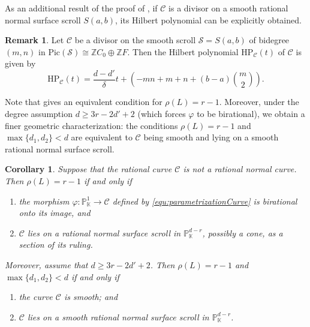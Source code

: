 \documentclass[a4paper, 11pt]{amsart}
\numberwithin{theorem}{section}
\newtheorem{corollary}[theorem]{Corollary}
\theoremstyle{definition}
\newtheorem{remark}[theorem]{Remark}
\numberwithin{equation}{section}
\begin{document}
As an additional result of the proof of , if $\mathcal{C}$ is a divisor on a smooth rational normal surface scroll $S(a,b)$, its Hilbert polynomial can be explicitly obtained.
\begin{remark}\label{rem:hilbertPolynomial}
Let $\mathcal{C}$ be a divisor on the smooth scroll $\mathcal{S} = S(a,b)$ of bidegree $(m,n)$ in $\mathrm{Pic}(\mathcal{S}) \cong \mathbb{Z}C_0 \oplus \mathbb{Z}F$. 
Then the Hilbert polynomial $\mathrm{HP}_{\mathcal{C}}(t)$ of $\mathcal{C}$ is given by
\[
\mathrm{HP}_{\mathcal{C}}(t) = \frac{d-d'}{\delta} t + \left( -mn + m + n + (b-a)\binom{m}{2} \right).
\]
\end{remark}
Note that  gives an equivalent condition for $\rho(L)=r-1$.
Moreover, under the degree assumption $d\geq 3r-2d'+2$ (which forces $\varphi$ to be birational), we obtain a finer geometric characterization: the conditions $\rho(L)=r-1$ and $\max\{d_1,d_2\}<d$ are equivalent to $\mathcal C$ being smooth and lying on a smooth rational normal surface scroll.
\begin{corollary}\label{cor:surface-r}
Suppose that the rational curve $\mathcal{C}$ is not a rational normal curve.
Then $\rho(L)=r-1$ if and only if
\begin{enumerate}
    \item[\textnormal{(i)}] the morphism $\varphi:\mathbb{P}_{\mathbb{K}}^1\rightarrow\mathcal{C}$ defined by \eqref{equ:parametrizationCurve} is birational onto its image, and
    \item[\textnormal{(ii)}] $\mathcal{C}$ lies on a rational normal surface scroll in $\mathbb{P}_{\mathbb{K}}^{d-r}$, possibly a cone, as a section of its ruling.
\end{enumerate}
Moreover, assume that $d\geq 3r-2d'+2$.
Then $\rho(L)=r-1$ and $\max\{d_1,d_2\}<d$ if and only if
\begin{enumerate}
    \item[\textnormal{(iii)}] the curve $\mathcal{C}$ is smooth; and
    \item[\textnormal{(iv)}] $\mathcal{C}$ lies on a smooth rational normal surface scroll in $\mathbb{P}_{\mathbb{K}}^{d-r}$.
\end{enumerate}
\end{corollary}
\end{document}
